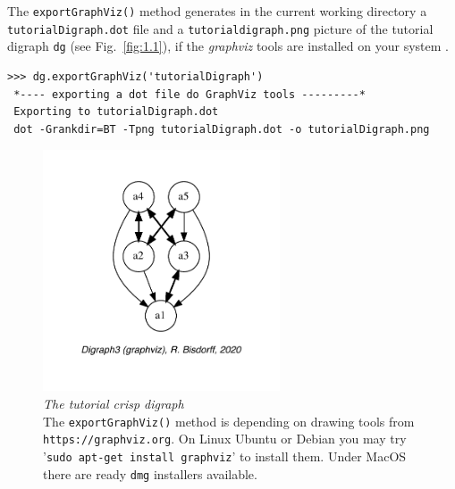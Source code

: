 The \texttt{exportGraphViz()} method generates in the current working directory a \texttt{tutorialDigraph.dot} file and a \texttt{tutorialdigraph.png} picture of the tutorial digraph \texttt{dg} (see Fig.~\vref{fig:1.1}), if the \emph{graphviz} tools are installed on your system \citep{graphviz}.
\begin{lstlisting}
>>> dg.exportGraphViz('tutorialDigraph')
 *---- exporting a dot file do GraphViz tools ---------*
 Exporting to tutorialDigraph.dot
 dot -Grankdir=BT -Tpng tutorialDigraph.dot -o tutorialDigraph.png
\end{lstlisting}
\begin{figure}[ht]
\sidecaption[t]
\includegraphics[width=7cm]{Figures/1-1-tutorialDigraph.pdf}
\caption[The tutorial crisp digraph]{\emph{The tutorial crisp digraph}\\ The \texttt{exportGraphViz()} method is depending on drawing tools from \texttt{https://graphviz.org}. On Linux Ubuntu or Debian you may try '\texttt{sudo apt-get install graphviz}’ to install them. Under MacOS there are ready \texttt{dmg} installers available.}
\label{fig:1.1}       %
\end{figure}

